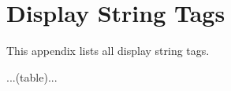 \chapter{Display String Tags}
\label{cha:display-string-tags}

This appendix lists all display string tags.

...(table)...


